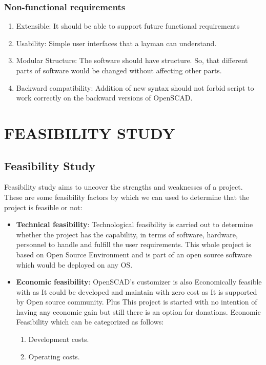 \documentclass[12pt,includeheadfoot,a4paper]{report}
\let\Oldsubsection\subsection
\renewcommand{\subsection}{\FloatBarrier\Oldsubsection}
\begin{document}
\subsection{Non-functional requirements}
\begin{enumerate}
	\item Extensible: It should be able to support future functional requirements
	\item Usability: Simple user interfaces that a layman can understand.
	\item Modular Structure: The software should have  structure. So, that different parts of software would be changed without affecting other parts.
	\item Backward compatibility: Addition of new syntax should not forbid script to work correctly on the backward versions of OpenSCAD.
\end{enumerate}


\chapter{FEASIBILITY STUDY}
\section{Feasibility Study}
Feasibility study aims to uncover the strengths and weaknesses of
a project. These are some feasibility factors by which we can used to determine that the project is feasible or not:
\begin{itemize}
	\item {\bf{Technical feasibility}}: Technological feasibility is carried
	out to determine whether the project has the capability, in terms of
	software, hardware, personnel to handle and fulfill the user requirements. This whole project is based on Open
	Source Environment and is part of an open source software which would be deployed on any OS.
	
	\item {\bf{Economic feasibility}}: OpenSCAD's customizer is also Economically feasible with as It could be developed and maintain with zero cost as It is supported by Open source community.
	Plus This project is started with no intention of having any economic gain but still there is an option for donations. Economic Feasibility which can be categorized
	as follows:
	\begin{enumerate}
		\item Development costs.
		\item Operating costs.
	\end{enumerate}

	
\end{itemize}
\end{document}
